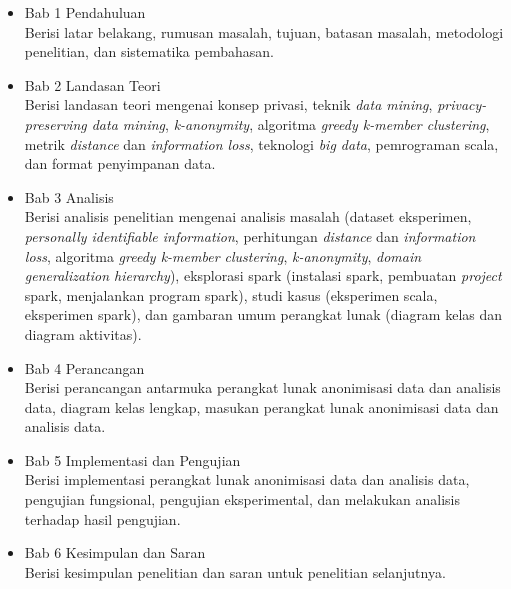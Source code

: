 \begin{itemize}

\item Bab 1 Pendahuluan\\
Berisi latar belakang, rumusan masalah, tujuan, batasan masalah, metodologi penelitian, dan sistematika pembahasan.

\item Bab 2 Landasan Teori\\
Berisi landasan teori mengenai konsep privasi, teknik \textit{data mining}, \textit{privacy-preserving data mining}, \textit{k-anonymity}, algoritma \textit{greedy k-member clustering}, metrik \textit{distance} dan \textit{information loss}, teknologi \textit{big data}, pemrograman scala, dan format penyimpanan data.

\item Bab 3 Analisis\\
Berisi analisis penelitian mengenai analisis masalah (dataset eksperimen, \textit{personally identifiable information}, perhitungan \textit{distance} dan \textit{information loss}, algoritma \textit{greedy k-member clustering}, \textit{k-anonymity}, \textit{domain generalization hierarchy}), eksplorasi spark (instalasi spark, pembuatan \textit{project} spark, menjalankan program spark), studi kasus (eksperimen  scala, eksperimen spark), dan gambaran umum perangkat lunak (diagram kelas dan diagram aktivitas).

\item Bab 4 Perancangan \\
Berisi perancangan antarmuka perangkat lunak anonimisasi data dan analisis data, diagram kelas lengkap, masukan perangkat lunak anonimisasi data dan analisis data.

\item Bab 5 Implementasi dan Pengujian\\
Berisi implementasi perangkat lunak anonimisasi data dan analisis data, pengujian fungsional, pengujian eksperimental, dan melakukan analisis terhadap hasil pengujian.

\item Bab 6 Kesimpulan dan Saran\\
Berisi kesimpulan penelitian dan saran untuk penelitian selanjutnya.

\end{itemize}
